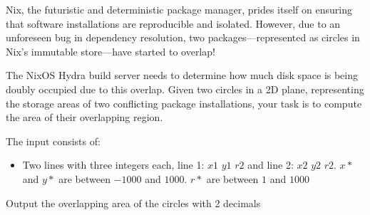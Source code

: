 \problemname{}


\newcommand{\maxa}{123456789}

Nix, the futuristic and deterministic package manager, prides itself on ensuring that software installations are reproducible and isolated. However, due to an unforeseen bug in dependency resolution, two packages—represented as circles in Nix’s immutable store—have started to overlap!

The NixOS Hydra build server needs to determine how much disk space is being doubly occupied due to this overlap. Given two circles in a 2D plane, representing the storage areas of two conflicting package installations, your task is to compute the area of their overlapping region.

\begin{Input}
    The input consists of:
    \begin{itemize}
        \item Two lines with three integers each, line 1: $x1$ $y1$ $r2$ and line 2: $x2$ $y2$ $r2$. $x*$ and $y*$ are between $-1000$ and $1000$. $r*$ are between $1$ and $1000$
    \end{itemize}
\end{Input}

\begin{Output}
    Output the overlapping area of the circles with 2 decimals
\end{Output}
